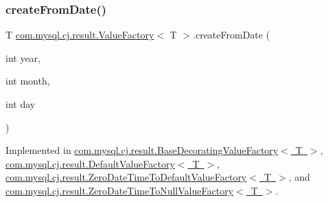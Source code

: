 \mbox{\label{interfacecom_1_1mysql_1_1cj_1_1result_1_1_value_factory_a5c7828e8fe372c9070e0e64ddafac761}} 
\subsubsection{\texorpdfstring{create\+From\+Date()}{createFromDate()}}
{\footnotesize\ttfamily T \mbox{\hyperlink{interfacecom_1_1mysql_1_1cj_1_1result_1_1_value_factory}{com.\+mysql.\+cj.\+result.\+Value\+Factory}}$<$ T $>$.create\+From\+Date (\begin{DoxyParamCaption}\item[{int}]{year,  }\item[{int}]{month,  }\item[{int}]{day }\end{DoxyParamCaption})}



Implemented in \mbox{\hyperlink{classcom_1_1mysql_1_1cj_1_1result_1_1_base_decorating_value_factory_a4c72385aed83cc4c020b79beabe53a5e}{com.\+mysql.\+cj.\+result.\+Base\+Decorating\+Value\+Factory$<$ T $>$}}, \mbox{\hyperlink{classcom_1_1mysql_1_1cj_1_1result_1_1_default_value_factory_a7abbef5c2c0a1da994d462bd01bc66ae}{com.\+mysql.\+cj.\+result.\+Default\+Value\+Factory$<$ T $>$}}, \mbox{\hyperlink{classcom_1_1mysql_1_1cj_1_1result_1_1_zero_date_time_to_default_value_factory_ae629c81471dfdf02f153bb84afcba93e}{com.\+mysql.\+cj.\+result.\+Zero\+Date\+Time\+To\+Default\+Value\+Factory$<$ T $>$}}, and \mbox{\hyperlink{classcom_1_1mysql_1_1cj_1_1result_1_1_zero_date_time_to_null_value_factory_a9c5174a7c37d8a880505d0bfcaccb891}{com.\+mysql.\+cj.\+result.\+Zero\+Date\+Time\+To\+Null\+Value\+Factory$<$ T $>$}}.

\mbox{\label{interfacecom_1_1mysql_1_1cj_1_1result_1_1_value_factory_a9977e0c9d2bb9e306ee4a5a2ead6840c}} 
